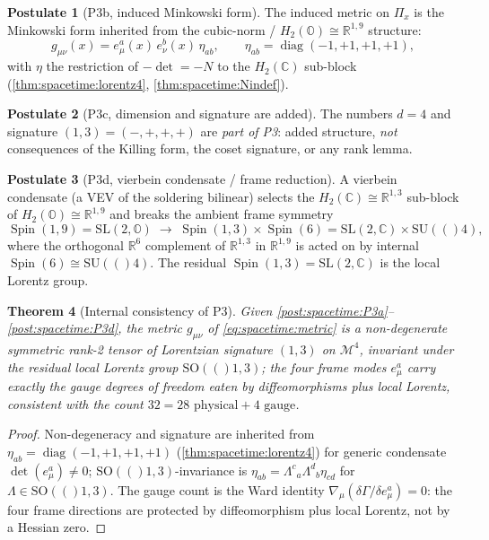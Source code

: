 \documentclass[11pt]{article}
\theoremstyle{plain}
\newtheorem{theorem}{Theorem}[section]
\theoremstyle{definition}
\newtheorem{postulate}[theorem]{Postulate}
\theoremstyle{remark}
\newcommand{\SU}[1]{\mathrm{SU}(#1)}
\newcommand{\SO}[1]{\mathrm{SO}(#1)}
\newcommand{\SL}{\mathrm{SL}}
\newcommand{\Spin}{\operatorname{Spin}}
\newcommand{\diag}{\operatorname{diag}}
\begin{document}
\begin{postulate}[P3b, induced Minkowski form]\label{post:spacetime:P3b}
The induced metric on $\Pi_x$ is the Minkowski form inherited from the cubic-norm /
$H_2(\mathbb O)\cong\mathbb R^{1,9}$ structure:
\begin{equation}\label{eq:spacetime:metric}
  g_{\mu\nu}(x)=e^a_\mu(x)\,e^b_\nu(x)\,\eta_{ab},\qquad
  \eta_{ab}=\diag(-1,+1,+1,+1),
\end{equation}
with $\eta$ the restriction of $-\det=-N$ to the $H_2(\mathbb C)$ sub-block
(\autoref{thm:spacetime:lorentz4}, \autoref{thm:spacetime:Nindef}).
\end{postulate}

\begin{postulate}[P3c, dimension and signature are added]\label{post:spacetime:P3c}
The numbers $d=4$ and signature $(1,3)=(-,+,+,+)$ are \emph{part of P3}: added
structure, \emph{not} consequences of the Killing form, the coset signature, or any
rank lemma.
\end{postulate}

\begin{postulate}[P3d, vierbein condensate / frame reduction]\label{post:spacetime:P3d}
A vierbein condensate (a VEV of the soldering bilinear) selects the
$H_2(\mathbb C)\cong\mathbb R^{1,3}$ sub-block of $H_2(\mathbb O)\cong\mathbb R^{1,9}$ and
breaks the ambient frame symmetry
\begin{equation}\label{eq:spacetime:framebreak}
  \Spin(1,9)=\SL(2,\mathbb O)\;\longrightarrow\;\Spin(1,3)\times\Spin(6)
  =\SL(2,\mathbb C)\times\SU(4),
\end{equation}
where the orthogonal $\mathbb R^6$ complement of $\mathbb R^{1,3}$ in $\mathbb R^{1,9}$
is acted on by internal $\Spin(6)\cong\SU(4)$. The residual $\Spin(1,3)=\SL(2,\mathbb C)$
is the local Lorentz group.
\end{postulate}

\begin{theorem}[Internal consistency of P3]\label{thm:spacetime:P3consistent}
Given \autoref{post:spacetime:P3a}--\autoref{post:spacetime:P3d}, the metric
$g_{\mu\nu}$ of \eqref{eq:spacetime:metric} is a non-degenerate symmetric rank-2 tensor
of Lorentzian signature $(1,3)$ on $\mathcal M^4$, invariant under the residual local
Lorentz group $\SO(1,3)$; the four frame modes $e^a_\mu$ carry exactly the gauge
degrees of freedom eaten by diffeomorphisms plus local Lorentz, consistent with the
count $32=28\text{ physical}+4\text{ gauge}$.
\end{theorem}
\begin{proof}
Non-degeneracy and signature are inherited from $\eta_{ab}=\diag(-1,+1,+1,+1)$
(\autoref{thm:spacetime:lorentz4}) for generic condensate $\det(e^a_\mu)\ne0$;
$\SO(1,3)$-invariance is $\eta_{ab}=\Lambda^c{}_a\Lambda^d{}_b\eta_{cd}$ for
$\Lambda\in\SO(1,3)$. The gauge count is the Ward identity
$\nabla_\mu(\delta\Gamma/\delta e^a_\mu)=0$: the four frame directions are protected by
diffeomorphism plus local Lorentz, not by a Hessian zero.
\end{proof}
\end{document}
